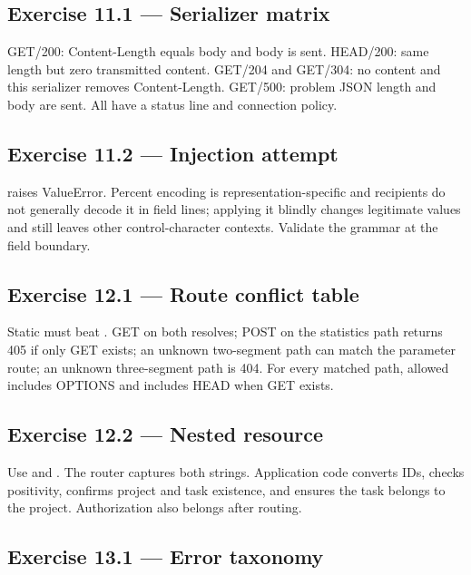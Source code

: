 \subsection*{Exercise 11.1 --- Serializer matrix}

GET/200: Content-Length equals body and body is sent. HEAD/200: same length but
zero transmitted content. GET/204 and GET/304: no content and this serializer
removes Content-Length. GET/500: problem JSON length and body are sent. All have
a status line and connection policy.

\subsection*{Exercise 11.2 --- Injection attempt}

 raises ValueError. Percent
encoding is representation-specific and recipients do not generally decode it
in field lines; applying it blindly changes legitimate values and still leaves
other control-character contexts. Validate the grammar at the field boundary.

\subsection*{Exercise 12.1 --- Route conflict table}

Static  must beat . GET on both
resolves; POST on the statistics path returns 405 if only GET exists; an unknown
two-segment path can match the parameter route; an unknown three-segment path is
404. For every matched path, allowed includes OPTIONS and includes HEAD when GET
exists.

\subsection*{Exercise 12.2 --- Nested resource}

Use  and
. The router captures both
strings. Application code converts IDs, checks positivity, confirms project and
task existence, and ensures the task belongs to the project. Authorization also
belongs after routing.

\subsection*{Exercise 13.1 --- Error taxonomy}

